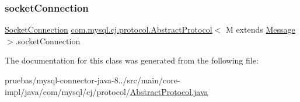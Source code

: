 \mbox{\label{classcom_1_1mysql_1_1cj_1_1protocol_1_1_abstract_protocol_a0c3af4e90e3533ff217b0c1d1f238f2d}} 
\subsubsection{\texorpdfstring{socket\+Connection}{socketConnection}}
{\footnotesize\ttfamily \mbox{\hyperlink{interfacecom_1_1mysql_1_1cj_1_1protocol_1_1_socket_connection}{Socket\+Connection}} \mbox{\hyperlink{classcom_1_1mysql_1_1cj_1_1protocol_1_1_abstract_protocol}{com.\+mysql.\+cj.\+protocol.\+Abstract\+Protocol}}$<$ M extends \mbox{\hyperlink{interfacecom_1_1mysql_1_1cj_1_1protocol_1_1_message}{Message}} $>$.socket\+Connection\hspace{0.3cm}{\ttfamily [protected]}}



The documentation for this class was generated from the following file\+:\begin{DoxyCompactItemize}
\item 
pruebas/mysql-\/connector-\/java-\/8../src/main/core-\/impl/java/com/mysql/cj/protocol/\mbox{\hyperlink{_abstract_protocol_8java}{Abstract\+Protocol.\+java}}\end{DoxyCompactItemize}
